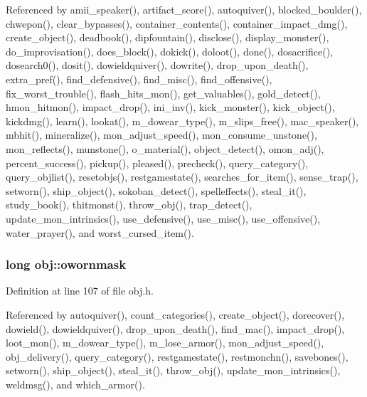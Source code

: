Referenced by amii\+\_\+speaker(), artifact\+\_\+score(), autoquiver(), blocked\+\_\+boulder(), chwepon(), clear\+\_\+bypasses(), container\+\_\+contents(), container\+\_\+impact\+\_\+dmg(), create\+\_\+object(), deadbook(), dipfountain(), disclose(), display\+\_\+monster(), do\+\_\+improvisation(), does\+\_\+block(), dokick(), doloot(), done(), dosacrifice(), dosearch0(), dosit(), dowieldquiver(), dowrite(), drop\+\_\+upon\+\_\+death(), extra\+\_\+pref(), find\+\_\+defensive(), find\+\_\+misc(), find\+\_\+offensive(), fix\+\_\+worst\+\_\+trouble(), flash\+\_\+hits\+\_\+mon(), get\+\_\+valuables(), gold\+\_\+detect(), hmon\+\_\+hitmon(), impact\+\_\+drop(), ini\+\_\+inv(), kick\+\_\+monster(), kick\+\_\+object(), kickdmg(), learn(), lookat(), m\+\_\+dowear\+\_\+type(), m\+\_\+slips\+\_\+free(), mac\+\_\+speaker(), mbhit(), mineralize(), mon\+\_\+adjust\+\_\+speed(), mon\+\_\+consume\+\_\+unstone(), mon\+\_\+reflects(), munstone(), o\+\_\+material(), object\+\_\+detect(), omon\+\_\+adj(), percent\+\_\+success(), pickup(), pleased(), precheck(), query\+\_\+category(), query\+\_\+objlist(), resetobjs(), restgamestate(), searches\+\_\+for\+\_\+item(), sense\+\_\+trap(), setworn(), ship\+\_\+object(), sokoban\+\_\+detect(), spelleffects(), steal\+\_\+it(), study\+\_\+book(), thitmonst(), throw\+\_\+obj(), trap\+\_\+detect(), update\+\_\+mon\+\_\+intrinsics(), use\+\_\+defensive(), use\+\_\+misc(), use\+\_\+offensive(), water\+\_\+prayer(), and worst\+\_\+cursed\+\_\+item().

\hypertarget{structobj_a7906e045755ba4099705764a4eb076c6}{
\subsubsection[{owornmask}]{\setlength{\rightskip}{0pt plus 5cm}long obj\+::owornmask}}\label{structobj_a7906e045755ba4099705764a4eb076c6}


Definition at line 107 of file obj.\+h.



Referenced by autoquiver(), count\+\_\+categories(), create\+\_\+object(), dorecover(), dowield(), dowieldquiver(), drop\+\_\+upon\+\_\+death(), find\+\_\+mac(), impact\+\_\+drop(), loot\+\_\+mon(), m\+\_\+dowear\+\_\+type(), m\+\_\+lose\+\_\+armor(), mon\+\_\+adjust\+\_\+speed(), obj\+\_\+delivery(), query\+\_\+category(), restgamestate(), restmonchn(), savebones(), setworn(), ship\+\_\+object(), steal\+\_\+it(), throw\+\_\+obj(), update\+\_\+mon\+\_\+intrinsics(), weldmsg(), and which\+\_\+armor().

